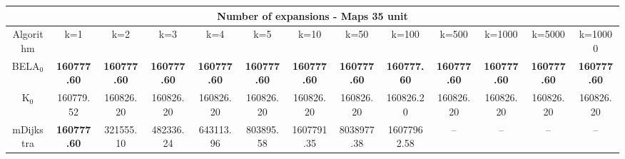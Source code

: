 \begin{tabular}{c|cccccccccccc}\toprule
\multicolumn{13}{c}{Number of expansions - Maps 35 unit}\\ \midrule
Algorithm & k=1 & k=2 & k=3 & k=4 & k=5 & k=10 & k=50 & k=100 & k=500 & k=1000 & k=5000 & k=10000 \\ \midrule
BELA$_0$ & \textbf{160777.60} & \textbf{160777.60} & \textbf{160777.60} & \textbf{160777.60} & \textbf{160777.60} & \textbf{160777.60} & \textbf{160777.60} & \textbf{160777.60} & \textbf{160777.60} & \textbf{160777.60} & \textbf{160777.60} & \textbf{160777.60} \\
K$_0$ & 160779.52 & 160826.20 & 160826.20 & 160826.20 & 160826.20 & 160826.20 & 160826.20 & 160826.20 & 160826.20 & 160826.20 & 160826.20 & 160826.20 \\
mDijkstra & \textbf{160777.60} & 321555.10 & 482336.24 & 643113.96 & 803895.58 & 1607791.35 & 8038977.38 & 16077962.58 & -- & -- & -- & -- \\ \bottomrule 
\end{tabular}
